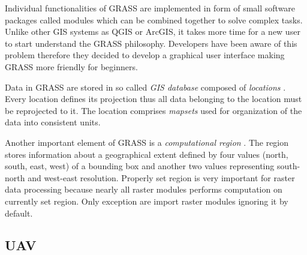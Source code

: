 \documentclass[a4paper,12pt]{article}
\newcommand{\term}[1]{%
{\it #1}%
}
\begin{document}


Individual functionalities of GRASS are implemented in form of small software packages called modules which 
can be combined together to solve complex tasks.
Unlike other GIS systems as QGIS or ArcGIS, it takes 
more time for a new user to start understand the GRASS philosophy.  Developers 
have been aware of this problem therefore they decided to develop a graphical user interface
making GRASS more friendly for beginners.


Data in GRASS are stored in so called  \term{GIS database} composed of \term{locations}. Every location 
defines its projection thus all data belonging to the location must be reprojected to it. 
The location comprises \term{mapsets} used for organization 
of the data into consistent units. 



Another important element of GRASS is a \term{computational region}. The region stores information about a geographical
extent defined by four values (north, south, east, west) of a bounding box and 
another two values representing south-north and west-east resolution. Properly set region is 
very important for raster data processing because nearly all raster modules performs computation 
on currently set region. Only exception are import raster modules ignoring it by default.


\subsection{UAV}
\label{sec:UAV_intro}
\end{document}
